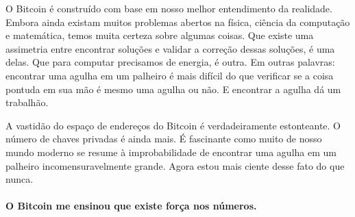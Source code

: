 O Bitcoin é construído com base em nosso melhor entendimento da realidade. Embora ainda existam muitos problemas abertos na física, ciência da computação e matemática, temos muita certeza sobre algumas coisas. Que existe uma assimetria entre encontrar soluções e validar a correção dessas soluções, é uma delas. Que para computar precisamos de energia, é outra. Em outras palavras: encontrar uma agulha em um palheiro é mais difícil do que verificar se a coisa pontuda em sua mão é mesmo uma agulha ou não. E encontrar a agulha dá um trabalhão.

A vastidão do espaço de endereços do Bitcoin é verdadeiramente estonteante. O número de chaves privadas é ainda mais. É fascinante como muito de nosso mundo moderno se resume à improbabilidade de encontrar uma agulha em um palheiro incomensuravelmente grande. Agora estou mais ciente desse fato do que nunca.

\paragraph{O Bitcoin me ensinou que existe força nos números.}

%
%
%
%
